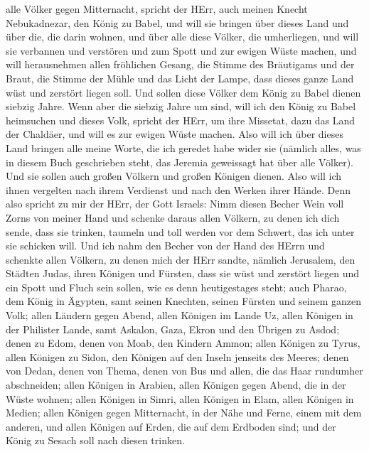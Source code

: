 alle Völker gegen Mitternacht, spricht der HErr, auch meinen Knecht
Nebukadnezar, den König zu Babel, und will sie bringen über dieses Land
und über die, die darin wohnen, und über alle diese Völker, die
umherliegen, und will sie verbannen und verstören und zum Spott und zur
ewigen Wüste machen,  und will herausnehmen allen
fröhlichen Gesang, die Stimme des Bräutigams und der Braut, die Stimme
der Mühle und das Licht der Lampe,  dass dieses ganze Land
wüst und zerstört liegen soll. Und sollen diese Völker dem König zu
Babel dienen siebzig Jahre.  Wenn aber die siebzig Jahre um
sind, will ich den König zu Babel heimsuchen und dieses Volk, spricht
der HErr, um ihre Missetat, dazu das Land der Chaldäer, und will es zur
ewigen Wüste machen.  Also will ich über dieses Land
bringen alle meine Worte, die ich geredet habe wider sie (nämlich alles,
was in diesem Buch geschrieben steht, das Jeremia geweissagt hat über
alle Völker).  Und sie sollen auch großen Völkern und
großen Königen dienen. Also will ich ihnen vergelten nach ihrem
Verdienst und nach den Werken ihrer Hände.  Denn also
spricht zu mir der HErr, der Gott Israels: Nimm diesen Becher Wein voll
Zorns von meiner Hand und schenke daraus allen Völkern, zu denen ich
dich sende,  dass sie trinken, taumeln und toll werden vor
dem Schwert, das ich unter sie schicken will.  Und ich nahm
den Becher von der Hand des HErrn und schenkte allen Völkern, zu denen
mich der HErr sandte,  nämlich Jerusalem, den Städten
Judas, ihren Königen und Fürsten, dass sie wüst und zerstört liegen und
ein Spott und Fluch sein sollen, wie es denn heutigestages steht;
 auch Pharao, dem König in Ägypten, samt seinen Knechten,
seinen Fürsten und seinem ganzen Volk;  allen Ländern gegen
Abend, allen Königen im Lande Uz, allen Königen in der Philister Lande,
samt Askalon, Gaza, Ekron und den Übrigen zu Asdod;  denen
zu Edom, denen von Moab, den Kindern Ammon;  allen Königen
zu Tyrus, allen Königen zu Sidon, den Königen auf den Inseln jenseits
des Meeres;  denen von Dedan, denen von Thema, denen von
Bus und allen, die das Haar rundumher abschneiden;  allen
Königen in Arabien, allen Königen gegen Abend, die in der Wüste wohnen;
 allen Königen in Simri, allen Königen in Elam, allen
Königen in Medien;  allen Königen gegen Mitternacht, in der
Nähe und Ferne, einem mit dem anderen, und allen Königen auf Erden, die
auf dem Erdboden sind; und der König zu Sesach soll nach diesen trinken.
